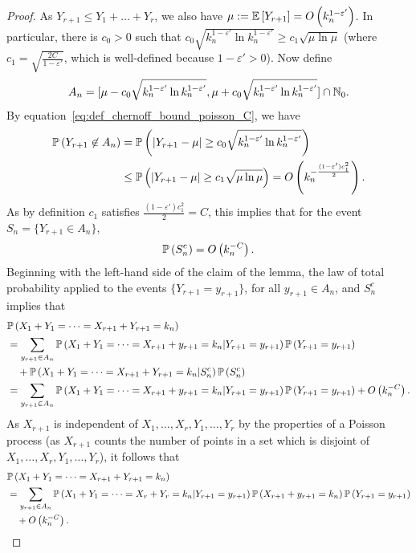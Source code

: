\begin{proof}
As $Y_{r+1} \leq Y_1+\dots+Y_r$, we also have $\mu:=\mathbb{E}\left[Y_{r+1}\right] = O\left(k_n^{1-\varepsilon'}\right)$. In particular, there is $c_0>0$ such that $c_0\sqrt{k_n^{1-\varepsilon'}\ln k_n^{1-\varepsilon'}}\geq c_1\sqrt{\mu\ln\mu}$ (where $c_1=\sqrt{\frac{2C}{1-\varepsilon'}}$, which is well-defined because $1-\varepsilon'>0$). Now define
\begin{align*}
A_n=[\mu-c_0\sqrt{k_n^{1-\varepsilon'}\ln k_n^{1-\varepsilon'}},\mu+c_0\sqrt{k_n^{1-\varepsilon'}\ln k_n^{1-\varepsilon'}}]\cap \N_0.%
\end{align*}
By equation~\eqref{eq:def_chernoff_bound_poisson_C}, we have
\begin{align*}
	\mathbb{P}\left(Y_{r+1} \not \in A_n\right) 
	&= \mathbb{P}\left(|Y_{r+1}-\mu|\geq c_0\sqrt{k_n^{1-\varepsilon'}\ln k_n^{1-\varepsilon'}}\right)\\
	&\le \mathbb{P}\left(|Y_{r+1}-\mu|\geq c_1\sqrt{\mu\ln\mu}\right)
	=O\left(k_n^{-\frac{(1-\varepsilon')c_1^2}{2}}\right).
\end{align*}
As by definition $c_1$ satisfies $\frac{(1-\varepsilon')c_1^2}{2}=C$, this implies that for the event $S_n = \{Y_{r+1}\in A_n\}$,
\[
	\mathbb{P}\left(S_n^c\right)=O\left(k_n^{-C}\right).
\]
Beginning with the left-hand side of the claim of the lemma, the law of total probability applied to the events $\{Y_{r+1}=y_{r+1}\}$, for all $y_{r+1}\in A_n$, and $S_n^c$ implies that
\begin{align*}
	&\mathbb{P}\left(X_1+Y_1=\dots=X_{r+1}+Y_{r+1}=k_n\right) \\
	&=\sum_{y_{r+1}\in A_n} \mathbb{P}\left(X_1+Y_1=\dots=X_{r+1}+y_{r+1}=k_n|Y_{r+1}=y_{r+1}\right)\mathbb{P}\left(Y_{r+1}=y_{r+1}\right)\\ 
	&\hspace{10pt}+ \mathbb{P}\left(X_1+Y_1=\dots=X_{r+1}+Y_{r+1}=k_n|S_n^c\right) \mathbb{P}\left(S_n^c\right)\\
	&=\sum_{y_{r+1}\in A_n} \mathbb{P}\left(X_1+Y_1=\dots=X_{r+1}+y_{r+1}=k_n|Y_{r+1}=y_{r+1}\right) 
		\mathbb{P}\left(Y_{r+1}=y_{r+1}\right)+O\left(k_n^{-C}\right).
\end{align*}
As $X_{r+1}$ is independent of $X_1, \dots, X_r, Y_1, \dots, Y_r$ by the properties of a Poisson process (as $X_{r+1}$ counts the number of points in a set which is disjoint of $X_1,\dots,X_r, Y_1, \dots, Y_r$), it follows that
\begin{align*}%
	&\Prob{X_1+Y_1=\dots=X_{r+1}+Y_{r+1}=k_n} \\
	&=\sum_{y_{r+1} \in A_n} \Prob{X_1+Y_1=\dots=X_{r}+Y_r=k_n|Y_{r+1}=y_{r+1}}
		\Prob{X_{r+1}+y_{r+1}=k_n} \Prob{Y_{r+1}=y_{r+1}}\\
	&\hspace{10pt} +\bigO{k_n^{-C}}.

\end{align*}
\end{proof}
